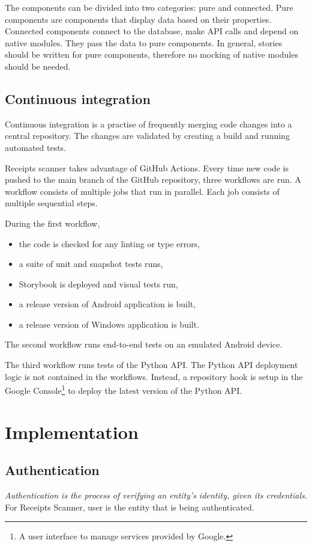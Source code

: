 \documentclass[
  digital, %
  table,   %
  oneside, %
  lof,     %
  lot,     %
]{fithesis3}
\begin{document}
The components can be divided into two categories: pure and connected. Pure components are components that display data based on their properties. Connected components connect to the database, make API calls and depend on native modules. They pass the data to pure components. In general, stories should be written for pure components, therefore no mocking of native modules should be needed.

\section{Continuous integration}
Continuous integration is a practise of frequently merging code changes into a central repository. The changes are validated by creating a build and running automated tests. \cite{Fowler2006Continuous}

Receipts scanner takes advantage of GitHub Actions. Every time new code is pushed to the main branch of the GitHub repository, three workflows are run. A workflow consists of multiple jobs that run in parallel. Each job consists of multiple sequential steps.

During the first workflow,
\begin{itemize}
    \item the code is checked for any linting or type errors,
    \item a suite of unit and snapshot tests runs,
    \item Storybook is deployed and visual tests run,
    \item a release version of Android application is built,
    \item a release version of Windows application is built.
\end{itemize}

The second workflow runs end-to-end tests on an emulated Android device.

The third workflow runs tests of the Python API. The Python API deployment logic is not contained in the workflows. Instead, a repository hook is setup in the Google Console\footnote{A user interface to manage services provided by Google.} to deploy the latest version of the Python API.

\chapter{Implementation}

\section{Authentication}
\textit{Authentication is the process of verifying an entity’s identity, given its credentials}\cite{Cankaya2011Authentication}.
For Receipts Scanner, user is the entity that is being authenticated.
\end{document}
